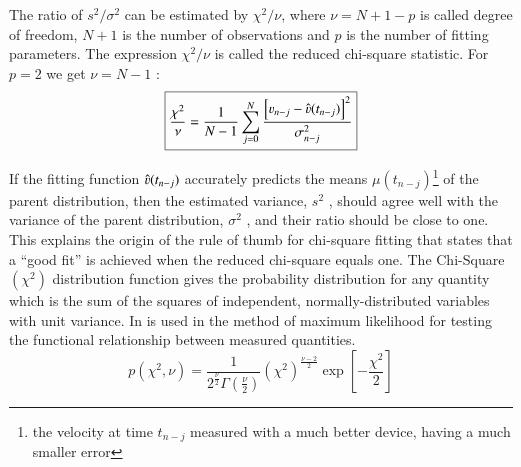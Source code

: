 The ratio of $s^2 /\sigma^2$ can be estimated by $\chi^2 / \nu$, where %
{ $ \nu  = N +1 - p $} is called degree of freedom, $N+1$ is the number of observations and $p$ is the number of fitting parameters. The expression $\chi^2 / \nu$ is called the 
{reduced chi-square} statistic.
For $p=2$ we get $\nu=N-1$ :
\begin{equation}
\boxed{
\frac{\chi^2}{\nu}=\frac{1}{N-1}\sum\limits_{j=0}^{N}\frac{\left [\varv_{n-j}-\hat{\varv}(t_{n-j})\right]^2}{\sigma^2_{n-j}}
}
\end{equation}

If the fitting function $\hat{\varv}(t_{n-j})$ accurately predicts the means $\mu(t_{n-j})$\footnote{the velocity at time $t_{n-j}$ measured with a much better device, having a much smaller error} of the parent distribution, then the estimated variance, $s^2$ , should agree well with the variance of the parent distribution, $\sigma^2$ , and their ratio should be close to one.
This explains the origin of the rule of thumb for chi-square fitting that states that a “good fit” is achieved when the reduced chi-square equals one.
The Chi-Square $(\chi^2 )$ distribution function gives the probability distribution for any quantity which is the sum of the squares of independent, normally-distributed variables with unit variance. In is used in the method of maximum likelihood for testing the functional relationship between measured quantities.
\begin{equation}
\boxed{
p(\chi^2,\nu)=\frac{1}{2^{\frac{\nu}{2}}\Gamma(\frac{\nu}{2})}\left(\chi^2\right)^{\frac{\nu-2}{2}}\exp\left[-\frac{\chi^2}{2}\right]
}
\end{equation}

